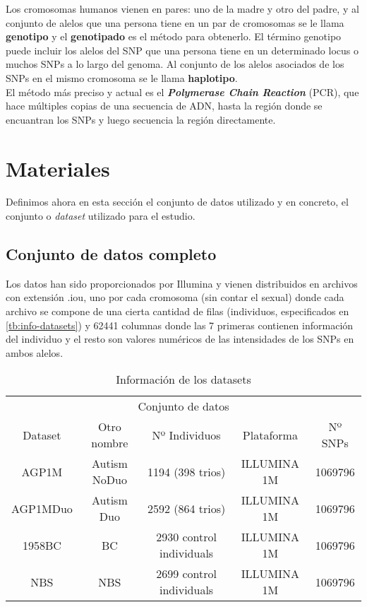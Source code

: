 Los cromosomas humanos vienen en pares: uno de la madre y otro del padre, y al conjunto de alelos que una persona tiene en un par de cromosomas se le llama \textbf{genotipo} y el \textbf{genotipado} es el método para obtenerlo. El término genotipo puede incluir los alelos del SNP que una persona tiene en un determinado locus o muchos SNPs a lo largo del genoma. Al conjunto de los alelos asociados de los SNPs en el mismo cromosoma se le llama \textbf{haplotipo}.\\
El método más preciso y actual es el \textbf{\textit{Polymerase Chain Reaction}} (PCR), que hace múltiples copias de una secuencia de ADN, hasta la región donde se encuantran los SNPs y luego secuencia la región directamente.
\newpage
\section{Materiales}
Definimos ahora en esta sección el conjunto de datos utilizado y en concreto, el conjunto o \textit{dataset} utilizado para el estudio.
\subsection{Conjunto de datos completo}
Los datos han sido proporcionados por Illumina y vienen distribuidos en archivos con extensión .iou, uno por cada cromosoma (sin contar el sexual) donde cada archivo se compone de una cierta cantidad de filas (individuos, especificados en \autoref{tb:info-datasets}) y 62441 columnas donde las 7 primeras contienen información del individuo y el resto son valores numéricos de las intensidades de los SNPs en ambos alelos.

\begin{table}[htpb]
  \centering
  \begin{tabular}{ccccc} \toprule
    \multicolumn{5}{c}{Conjunto de datos} \\ \cmidrule(r){1-5}
    Dataset & Otro nombre & Nº Individuos & Plataforma & Nº SNPs          \\ \midrule
    AGP1M & Autism NoDuo & 1194 (398 trios) & ILLUMINA 1M & 1069796          \\ 
    AGP1MDuo & Autism Duo & 2592 (864 trios) & ILLUMINA 1M & 1069796          \\ 
    1958BC & BC & 2930 control individuals & ILLUMINA 1M & 1069796          \\
    NBS & NBS & 2699 control individuals & ILLUMINA 1M & 1069796          \\ \bottomrule
  \end{tabular}
  \caption{Información de los datasets}
  \label{tb:info-datasets}
\end{table}

